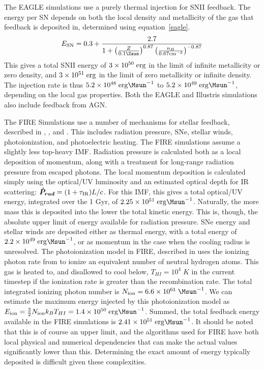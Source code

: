 The EAGLE simulations \citep{Crain2015} use a purely thermal
injection for SNII feedback.  The energy per SN depends on both the local
density and metallicity of the gas that feedback is deposited in, determined
using equation~\ref{eagle}.
\begin{equation}
    E_{\rm SN} = 0.3 +
    \frac{2.7}{1+\left(\frac{Z}{0.1\Zsun}\right)^{0.87}\left(\frac{n_H}{0.67\rm{cm}^{-3}}\right)^{-0.87}}
    \label{eagle}
\end{equation}
This gives a total SNII energy of $3\times10^{50}\;\rm{erg}$ in the limit of
infinite metallicity or zero density, and $3\times10^{51}\;\rm{erg}$ in the
limit of zero metallicity or infinite density.  The injection rate is thus
$5.2\times10^{48}\;\rm{erg}\Msun^{-1}$ to
$5.2\times10^{49}\;\rm{erg}\Msun^{-1}$, depending on the local gas properties.
Both the EAGLE and Illustris simulations also include feedback from AGN.  

The FIRE Simulations \citep{Hopkins2014} use a number of mechanisms for stellar
feedback, described in \cite{Hopkins2011}, \citet{Hopkins2012a}, and
\citet{Hopkins2012b}.  This includes radiation pressure, SNe, stellar
winds, photoionization, and photoelectric heating.  The FIRE simulations assume
a slightly less top-heavy \citep{Kroupa2003} IMF.  Radiation pressure is
calculated both as a local deposition of momentum, along with a treatment for
long-range radiation pressure from escaped photons.  The local momentum
deposition is calculated simply using the optical/UV luminosity and an estimated
optical depth for IR scattering: $\boldsymbol{\dot P_{rad}} = (1+\tau_{\rm IR})L/c$.
For this IMF, this gives a total optical/UV energy, integrated over the 1 Gyr,
of $2.25\times10^{51}\;\rm{erg}\Msun^{-1}$.  Naturally, the more mass this is
deposited into the lower the total kinetic energy.  This is, though, the
absolute upper limit of energy available for radiation pressure.  SNe
energy and stellar winds are deposited either as thermal energy, with a total
energy of $2.2\times10^{49}\;\rm{erg}\Msun^{-1}$, or as momentum in the case
when the cooling radius is unresolved.  The photoionization model in FIRE,
described in \citet{Hopkins2012a} uses the ionizing photon rate from
\citet{Leitherer1999} to ionize an equivalent number of neutral hydrogen atoms.  This
gas is heated to, and disallowed to cool below, $T_{HI}=10^4\;K$ in the current
timestep if the ionization rate is greater than the recombination rate.  The
total integrated ionizing photon number is $N_{\rm ion} =
6.6\times10^{61}\;\Msun^{-1}$.  We can estimate the maximum energy injected by
this photoionization model as $E_{\rm ion} = \frac{3}{2}N_{\rm ion}k_BT_{HI} =
1.4\times10^{50}\;\rm{erg}\Msun^{-1}$.  Summed, the total feedback energy
available in the FIRE simulations is $2.41\times10^{51}\;\rm{erg}\Msun^{-1}$.
It should be noted that this is of course an upper limit, and the algorithms
used for FIRE have both local physical and numerical dependencies that can make
the actual values significantly lower than this.  Determining the exact amount
of energy typically deposited is difficult given these complexities.

